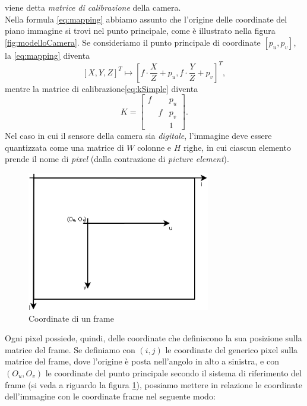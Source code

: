 viene detta \textit{matrice di calibrazione} della camera.\\
Nella formula \eqref{eq:mapping} abbiamo assunto che l'origine delle coordinate del piano immagine si trovi nel punto principale, come \`e illustrato nella figura \ref{fig:modelloCamera}.
Se consideriamo il punto principale di coordinate $[p_u, p_v]$, la \eqref{eq:mapping} diventa
 \begin{equation}
 \label{eq:mappingGeneral}
 [X,Y,Z]^\textit{T} \mapsto \left[f\cdot \frac{X}{Z}+p_u, f\cdot \frac{Y}{Z}+p_v\right]^\textit{T},
 \end{equation}
 mentre la matrice di calibrazione\eqref{eq:kSimple} diventa 
 \begin{equation}
 \label{eq:kGeneral}
 K =
  \left[\begin{array}{rcl}
  f & & p_u \\
  & f & p_v \\
  & & 1 
  \end{array}\right].
 \end{equation}
 Nel caso in cui il sensore della camera sia \textit{digitale}, l'immagine deve essere quantizzata come una matrice di $W$ colonne e $H$ righe, in cui ciascun elemento prende il nome di \textit{pixel} (dalla contrazione di \textit{picture element}).
 \begin{figure}
 	\centering
 	\includegraphics[width=8cm]{./pictures/griglia}
 	\caption{Coordinate di un frame}
 	\label{fig:griglia}
 \end{figure}
 Ogni pixel possiede, quindi, delle coordinate che definiscono la sua posizione sulla matrice del frame.
 Se definiamo con $(i,j)$ le coordinate del generico pixel sulla matrice del frame, dove l'origine \`e posta nell'angolo in alto a sinistra, e con $(O_u, O_v)$ le coordinate del punto principale secondo il sistema di riferimento del frame (si veda a riguardo la figura \ref{fig:griglia}), possiamo mettere in relazione le coordinate dell'immagine con le coordinate frame nel seguente modo:
